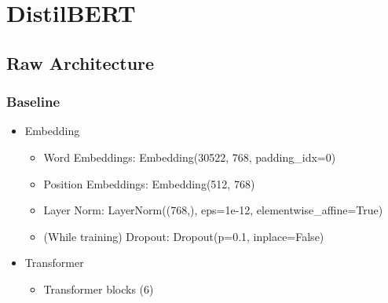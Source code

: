 \documentclass{article}
\begin{document}
	\section{DistilBERT}
	
	\subsection{Raw Architecture}
	
	\subsubsection{Baseline}
	
	\begin{itemize}
		\item Embedding
		
		\begin{itemize}
			\item Word Embeddings: Embedding(30522, 768, padding\_idx=0)
			\item Position Embeddings: Embedding(512, 768)
			\item Layer Norm: LayerNorm((768,), eps=1e-12, elementwise\_affine=True)
			\item (While training) Dropout: Dropout(p=0.1, inplace=False)
		\end{itemize}
		
		\item Transformer
		\begin{itemize}
			
			\item Transformer blocks (6)
			\begin{itemize}
				

\end{itemize}
\end{itemize}
\end{itemize}
\end{document}
